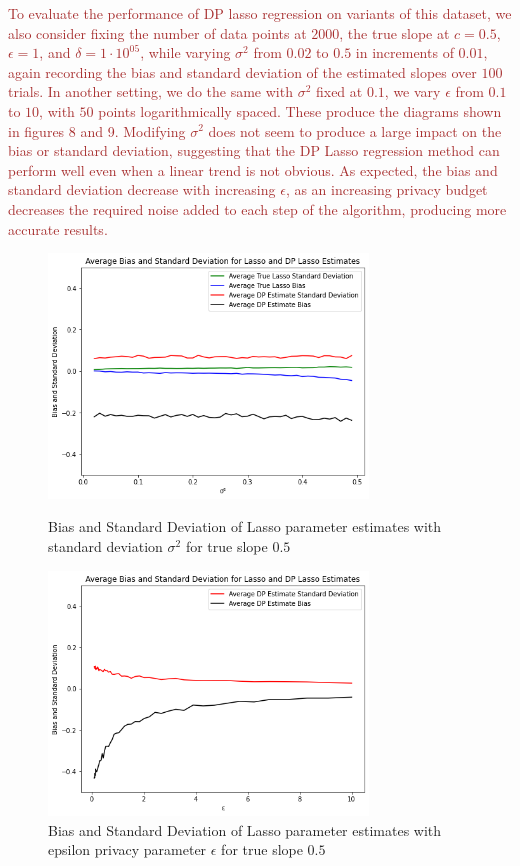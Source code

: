 \documentclass[11pt,conference]{IEEEtran}
\begin{document}
\textcolor{brown}{To evaluate the performance of DP lasso regression on variants of this dataset, we also consider fixing the number of data points at $2000$, the true slope at $c=0.5$, $\epsilon=1$, and $\delta=1\cdot 10^{05}$, while varying $\sigma^2$ from $0.02$ to $0.5$ in increments of $0.01$, again recording the bias and standard deviation of the estimated slopes over $100$ trials. In another setting, we do the same with $\sigma^2$ fixed at $0.1$, we vary $\epsilon$ from $0.1$ to $10$, with $50$ points logarithmically spaced. These produce the diagrams shown in figures 8 and 9. Modifying $\sigma^2$ does not seem to produce a large impact on the bias or standard deviation, suggesting that the DP Lasso regression method can perform well even when a linear trend is not obvious. As expected, the bias and standard deviation decrease with increasing $\epsilon$, as an increasing privacy budget decreases the required noise added to each step of the algorithm, producing more accurate results.}

\begin{figure}[htbp]
\centerline{\includegraphics[width=8.5cm]{plots/lasso_sigmas.png}}
\caption{Bias and Standard Deviation of Lasso parameter estimates with standard deviation $\sigma^2$ for true slope $0.5$} \bigskip
\centerline{\includegraphics[width=8.5cm]{plots/lasso_epsilon.png}}
\caption{Bias and Standard Deviation of Lasso parameter estimates with epsilon privacy parameter $\epsilon$ for true slope $0.5$}
\label{fig}
\end{figure}
\end{document}
